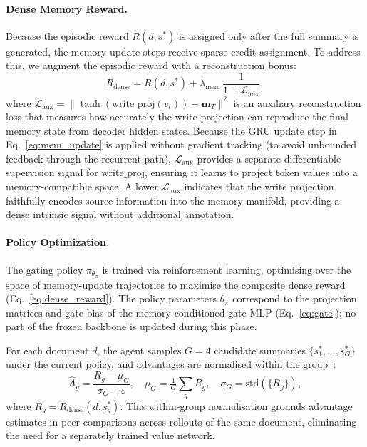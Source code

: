 \documentclass{article}
\begin{document}
\paragraph{Dense Memory Reward.}
Because the episodic reward $R(d, s^*)$ is assigned only after the full summary is generated, the memory update steps receive sparse credit assignment.
To address this, we augment the episodic reward with a reconstruction bonus:
\begin{equation}
\label{eq:dense_reward}
R_{\text{dense}} = R(d,s^*) + \lambda_{\text{mem}}\,\frac{1}{1 + \mathcal{L}_{\text{aux}}},
\end{equation}
where $\mathcal{L}_{\text{aux}} = \|\tanh(\mathrm{write\_proj}(v_t)) - \mathbf{m}_{T}\|^2$ is an auxiliary reconstruction loss that measures how accurately the write projection can reproduce the final memory state from decoder hidden states.
Because the GRU update step in Eq.~\ref{eq:mem_update} is applied without gradient tracking (to avoid unbounded feedback through the recurrent path), $\mathcal{L}_{\text{aux}}$ provides a separate differentiable supervision signal for $\mathrm{write\_proj}$, ensuring it learns to project token values into a memory-compatible space.
A lower $\mathcal{L}_{\text{aux}}$ indicates that the write projection faithfully encodes source information into the memory manifold, providing a dense intrinsic signal without additional annotation.

\paragraph{Policy Optimization.}
The gating policy $\pi_{\theta_\pi}$ is trained via reinforcement learning, optimising over the space of memory-update trajectories to maximise the composite dense reward (Eq.~\ref{eq:dense_reward}).
The policy parameters $\theta_\pi$ correspond to the projection matrices and gate bias of the memory-conditioned gate MLP (Eq.~\ref{eq:gate}); no part of the frozen backbone is updated during this phase.

For each document $d$, the agent samples $G{=}4$ candidate summaries $\{s^*_1, \ldots, s^*_G\}$ under the current policy, and advantages are normalised within the group~\citep{shao2024deepseekmath}:
\begin{equation}
\label{eq:grpo_adv}
\hat{A}_g = \frac{R_g - \mu_G}{\sigma_G + \varepsilon},
\quad
\mu_G = \tfrac{1}{G}\textstyle\sum_g R_g,\quad
\sigma_G = \mathrm{std}(\{R_g\}),
\end{equation}
where $R_g = R_{\text{dense}}(d, s^*_g)$.
This within-group normalisation grounds advantage estimates in peer comparisons across rollouts of the same document, eliminating the need for a separately trained value network.
\end{document}
